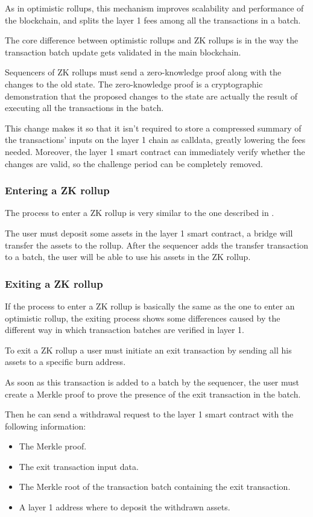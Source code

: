 \documentclass[11pt]{article}
\begin{document}
As in optimistic rollups, this mechanism improves scalability and performance of the blockchain, and splits the layer 1 fees among all the transactions in a batch.

The core difference between optimistic rollups and ZK rollups is in the way the transaction batch update gets validated in the main blockchain.

Sequencers of ZK rollups must send a zero-knowledge proof along with the changes to the old state. The zero-knowledge proof is a cryptographic demonstration that the proposed changes to the state are actually the result of executing all the transactions in the batch.

This change makes it so that it isn't required to store a compressed summary of the transactions' inputs on the layer 1 chain as calldata, greatly lowering the fees needed. Moreover, the layer 1 smart contract can immediately verify whether the changes are valid, so the challenge period can be completely removed.

\subsubsection{Entering a ZK rollup} \label{subsubsection:entering_zk_rollup}
The process to enter a ZK rollup is very similar to the one described in .

The user must deposit some assets in the layer 1 smart contract, a bridge will transfer the assets to the rollup. After the sequencer adds the transfer transaction to a batch, the user will be able to use his assets in the ZK rollup.

\subsubsection{Exiting a ZK rollup} \label{subsubsection:exiting_zk_rollup}
If the process to enter a ZK rollup is basically the same as the one to enter an optimistic rollup, the exiting process shows some differences caused by the different way in which transaction batches are verified in layer 1.

To exit a ZK rollup a user must initiate an exit transaction by sending all his assets to a specific burn address.

As soon as this transaction is added to a batch by the sequencer, the user must create a Merkle proof to prove the presence of the exit transaction in the batch.

Then he can send a withdrawal request to the layer 1 smart contract with the following information:
\begin{itemize}
    \item The Merkle proof.
    \item The exit transaction input data.
    \item The Merkle root of the transaction batch containing the exit transaction.
    \item A layer 1 address where to deposit the withdrawn assets.
\end{itemize}
\end{document}
